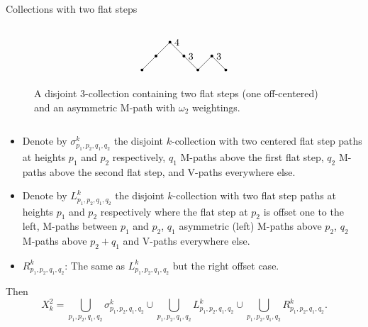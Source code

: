 \documentclass[12pt,mathserif]{beamer}
\begin{document}
\begin{frame}[allowframebreaks]{Collections with two flat steps}
\begin{columns}
\begin{column}{0.45\textwidth}
\begin{figure}
\begin{equation*}
\begin{tikzpicture}[scale=0.50]
	\node at (0,3) [circle, fill, inner sep=1pt]{};
	\node at (1,4) [circle, fill, inner sep=1pt]{};
	\node at (2,5) [circle, fill, inner sep=1pt]{};
	\node at (3,4) [circle, fill, inner sep=1pt]{};
	\node at (4,3) [circle, fill, inner sep=1pt]{};
	\node at (5,4) [circle, fill, inner sep=1pt]{};
	\node at (6,3) [circle, fill, inner sep=1pt]{};
	\draw (0,3) -- (1,4) -- (2,5);
	\draw (2,5) -- node[above] {4} (3,4);
	\draw (3,4) -- node[above] {3} (4,3);
	\draw (4,3) -- (5,4);
	\draw (5,4) -- node[above] {3} (6,3);
\end{tikzpicture}
\end{equation*}
\caption{\label{fig:asymMpath} A disjoint 3-collection containing two flat steps (one off-centered) and an asymmetric M-path with $\omega_2$ weightings.}
\end{figure}
\end{column}
\end{columns}

\framebreak

\begin{lemma}
\begin{itemize}
\item Denote by $\sigma^k_{p_1,p_2,q_1,q_2}$ the disjoint $k$-collection with two centered flat step paths at heights $p_1$ and $p_2$ respectively, $q_1$ M-paths above the first flat step, $q_2$ M-paths above the second flat step, and V-paths everywhere else.
\item Denote by $L^k_{p_1,p_2,q_1,q_2}$ the disjoint $k$-collection with two flat step paths at heights $p_1$ and $p_2$ respectively where the flat step at $p_2$ is offset one to the left, M-paths between $p_1$ and $p_2$, $q_1$ asymmetric (left) M-paths above $p_2$, $q_2$ M-paths above $p_2+q_1$ and V-paths everywhere else.
\item $R^k_{p_1,p_2,q_1,q_2}$: The same as $L^k_{p_1,p_2,q_1,q_2}$ but the right offset case.
\end{itemize}
Then
\begin{equation*}
X_k^2 = \bigcup\limits_{p_1,p_2,q_1,q_2}\sigma_{p_1,p_2,q_1,q_2}^k \cup \bigcup\limits_{p_1,p_2,q_1,q_2}L_{p_1,p_2,q_1,q_2}^k \cup \bigcup\limits_{p_1,p_2,q_1,q_2}R_{p_1,p_2,q_1,q_2}^k.
\end{equation*}
\end{lemma}

\end{frame}
\end{document}
